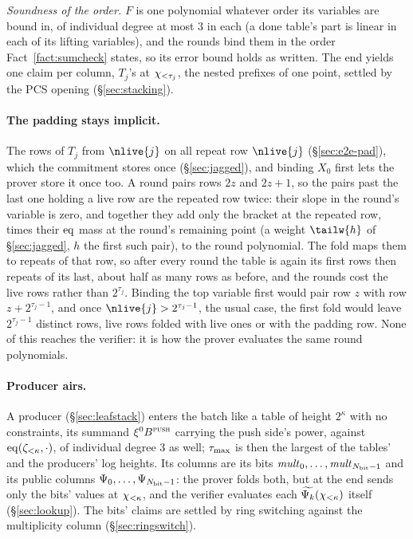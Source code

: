 \emph{Soundness of the order.} $F$ is one polynomial whatever order its variables are bound in, of individual degree at most $3$ in each (a done table's part is linear in each of its lifting variables), and the rounds bind them in the order Fact~\ref{fact:sumcheck} states, so its error bound holds as written. The end yields one claim per column, $T_j$'s at $\chi_{<\tau_j}$, the nested prefixes of one point, settled by the PCS opening (\S\ref{sec:stacking}).

\paragraph{The padding stays implicit.} The rows of $T_j$ from $\nlive{j}$ on all repeat row $\nlive{j}$ (\S\ref{sec:e2e-pad}), which the commitment stores once (\S\ref{sec:jagged}), and binding $X_0$ first lets the prover store it once too. A round pairs rows $2z$ and $2z+1$, so the pairs past the last one holding a live row are the repeated row twice: their slope in the round's variable is zero, and together they add only the bracket at the repeated row, times their $\operatorname{eq}$ mass at the round's remaining point (a weight $\tailw{h}$ of \S\ref{sec:jagged}, $h$ the first such pair), to the round polynomial. The fold maps them to repeats of that row, so after every round the table is again its first rows then repeats of its last, about half as many rows as before, and the rounds cost the live rows rather than $2^{\tau_j}$. Binding the top variable first would pair row $z$ with row $z+2^{\tau_j-1}$, and once $\nlive{j}>2^{\tau_j-1}$, the usual case, the first fold would leave $2^{\tau_j-1}$ distinct rows, live rows folded with live ones or with the padding row. None of this reaches the verifier: it is how the prover evaluates the same round polynomials.

\paragraph{Producer airs.} A producer (\S\ref{sec:leafstack}) enters the batch like a table of height $2^{\kappa}$ with no constraints, its summand $\xi^{0}B^{\textsc{push}}$ carrying the push side's power, against $\operatorname{eq}(\zeta_{<\kappa},\cdot)$, of individual degree $3$ as well; $\tau_{\max}$ is then the largest of the tables' and the producers' log heights. Its columns are its bits $\mathit{mult}_{0},\dots,\mathit{mult}_{N_{\mathrm{bit}}-1}$ and its public columns $\Psi_{0},\dots,\Psi_{N_{\mathrm{bit}}-1}$: the prover folds both, but at the end sends only the bits' values at $\chi_{<\kappa}$, and the verifier evaluates each $\widetilde{\Psi_{k}}(\chi_{<\kappa})$ itself (\S\ref{sec:lookup}). The bits' claims are settled by ring switching against the multiplicity column (\S\ref{sec:ringswitch}).

